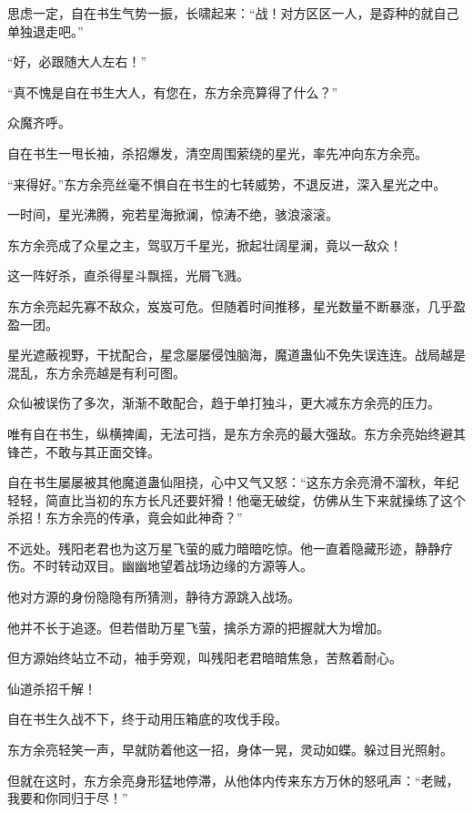 
\begin{this_body}



思虑一定，自在书生气势一振，长啸起来：“战！对方区区一人，是孬种的就自己单独退走吧。”

“好，必跟随大人左右！”

“真不愧是自在书生大人，有您在，东方余亮算得了什么？”

众魔齐呼。

自在书生一甩长袖，杀招爆发，清空周围萦绕的星光，率先冲向东方余亮。

“来得好。”东方余亮丝毫不惧自在书生的七转威势，不退反进，深入星光之中。

一时间，星光沸腾，宛若星海掀澜，惊涛不绝，骇浪滚滚。

东方余亮成了众星之主，驾驭万千星光，掀起壮阔星澜，竟以一敌众！

这一阵好杀，直杀得星斗飘摇，光屑飞溅。

东方余亮起先寡不敌众，岌岌可危。但随着时间推移，星光数量不断暴涨，几乎盈盈一团。

星光遮蔽视野，干扰配合，星念屡屡侵蚀脑海，魔道蛊仙不免失误连连。战局越是混乱，东方余亮越是有利可图。

众仙被误伤了多次，渐渐不敢配合，趋于单打独斗，更大减东方余亮的压力。

唯有自在书生，纵横捭阖，无法可挡，是东方余亮的最大强敌。东方余亮始终避其锋芒，不敢与其正面交锋。

自在书生屡屡被其他魔道蛊仙阻挠，心中又气又怒：“这东方余亮滑不溜秋，年纪轻轻，简直比当初的东方长凡还要奸猾！他毫无破绽，仿佛从生下来就操练了这个杀招！东方余亮的传承，竟会如此神奇？”

不远处。残阳老君也为这万星飞萤的威力暗暗吃惊。他一直着隐藏形迹，静静疗伤。不时转动双目。幽幽地望着战场边缘的方源等人。

他对方源的身份隐隐有所猜测，静待方源跳入战场。

他并不长于追逐。但若借助万星飞萤，擒杀方源的把握就大为增加。

但方源始终站立不动，袖手旁观，叫残阳老君暗暗焦急，苦熬着耐心。

仙道杀招千解！

自在书生久战不下，终于动用压箱底的攻伐手段。

东方余亮轻笑一声，早就防着他这一招，身体一晃，灵动如蝶。躲过目光照射。

但就在这时，东方余亮身形猛地停滞，从他体内传来东方万休的怒吼声：“老贼，我要和你同归于尽！”


\end{this_body}
